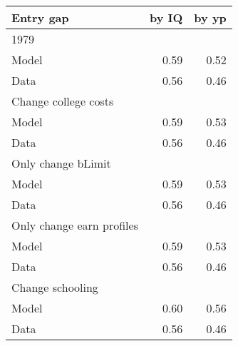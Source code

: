 \begin{tabular}{lrr}
\hline
Entry gap & by IQ  & by yp  \\ 
\hline
1979 &   &   \\ 
Model & 0.59  & 0.52  \\ 
Data & 0.56  & 0.46  \\ 
Change college costs &   &   \\ 
Model & 0.59  & 0.53  \\ 
Data & 0.56  & 0.46  \\ 
Only change bLimit &   &   \\ 
Model & 0.59  & 0.53  \\ 
Data & 0.56  & 0.46  \\ 
Only change earn profiles &   &   \\ 
Model & 0.59  & 0.53  \\ 
Data & 0.56  & 0.46  \\ 
Change schooling &   &   \\ 
Model & 0.60  & 0.56  \\ 
Data & 0.56  & 0.46  \\ 
\hline
\end{tabular}%
